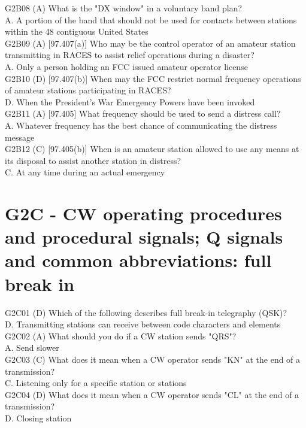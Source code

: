 \documentclass[12pt,letterpaper]{report}
\begin{document}
G2B08 (A) What is the "DX window" in a voluntary band plan?\\
A. A portion of the band that should not be used for contacts between stations within the 48 contiguous United States \\

G2B09 (A) [97.407(a)] Who may be the control operator of an amateur station transmitting in RACES to assist relief operations during a disaster?\\
A. Only a person holding an FCC issued amateur operator license\\

G2B10 (D) [97.407(b)] When may the FCC restrict normal frequency operations of amateur stations participating in RACES?\\
D. When the President's War Emergency Powers have been invoked\\

G2B11 (A) [97.405] What frequency should be used to send a distress call?\\
A. Whatever frequency has the best chance of communicating the distress message\\

G2B12 (C) [97.405(b)] When is an amateur station allowed to use any means at its disposal to assist another station in distress?\\
C. At any time during an actual emergency\\

\section{G2C - CW operating procedures and procedural signals; Q signals and common abbreviations: full break in}

G2C01 (D) Which of the following describes full break-in telegraphy (QSK)?\\
D. Transmitting stations can receive between code characters and elements\\

G2C02 (A) What should you do if a CW station sends "QRS"?\\
A. Send slower\\

G2C03 (C) What does it mean when a CW operator sends "KN" at the end of a transmission?\\
C. Listening only for a specific station or stations\\

G2C04 (D) What does it mean when a CW operator sends "CL" at the end of a transmission?\\
D. Closing station\\
\end{document}
